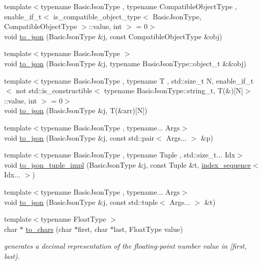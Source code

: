 \begin{DoxyCompactItemize}
{\footnotesize template$<$typename Basic\+Json\+Type , typename Compatible\+Object\+Type , enable\+\_\+if\+\_\+t$<$ is\+\_\+compatible\+\_\+object\+\_\+type$<$ Basic\+Json\+Type, Compatible\+Object\+Type $>$\+::value, int $>$  = 0$>$ }\\void \hyperlink{namespacenlohmann_1_1detail_a24c9c12f3839c94e09532f08de85e949}{to\+\_\+json} (Basic\+Json\+Type \&j, const Compatible\+Object\+Type \&obj)
\item 
{\footnotesize template$<$typename Basic\+Json\+Type $>$ }\\void \hyperlink{namespacenlohmann_1_1detail_ac9f7a5542851c61d93740148eaec509f}{to\+\_\+json} (Basic\+Json\+Type \&j, typename Basic\+Json\+Type\+::object\+\_\+t \&\&obj)
\item 
{\footnotesize template$<$typename Basic\+Json\+Type , typename T , std\+::size\+\_\+t N, enable\+\_\+if\+\_\+t$<$ not std\+::is\+\_\+constructible$<$ typename Basic\+Json\+Type\+::string\+\_\+t, T(\&)\mbox{[}\+N\mbox{]}$>$\+::value, int $>$  = 0$>$ }\\void \hyperlink{namespacenlohmann_1_1detail_a8c4d301fc51996e3c5c1257fb92ace20}{to\+\_\+json} (Basic\+Json\+Type \&j, T(\&arr)\mbox{[}N\mbox{]})
\item 
{\footnotesize template$<$typename Basic\+Json\+Type , typename... Args$>$ }\\void \hyperlink{namespacenlohmann_1_1detail_aa30611f74062379d3420c40487cf3bb3}{to\+\_\+json} (Basic\+Json\+Type \&j, const std\+::pair$<$ Args... $>$ \&p)
\item 
{\footnotesize template$<$typename Basic\+Json\+Type , typename Tuple , std\+::size\+\_\+t... Idx$>$ }\\void \hyperlink{namespacenlohmann_1_1detail_a510dfa15b01e9a8afe31600a27b28199}{to\+\_\+json\+\_\+tuple\+\_\+impl} (Basic\+Json\+Type \&j, const Tuple \&t, \hyperlink{structnlohmann_1_1detail_1_1index__sequence}{index\+\_\+sequence}$<$ Idx... $>$)
\item 
{\footnotesize template$<$typename Basic\+Json\+Type , typename... Args$>$ }\\void \hyperlink{namespacenlohmann_1_1detail_aa7a47b08eee864c2c108c04954919648}{to\+\_\+json} (Basic\+Json\+Type \&j, const std\+::tuple$<$ Args... $>$ \&t)
\item 
{\footnotesize template$<$typename Float\+Type $>$ }\\char $\ast$ \hyperlink{namespacenlohmann_1_1detail_a6192f1eab05fbbc5c35edb8368c8fc57}{to\+\_\+chars} (char $\ast$first, char $\ast$last, Float\+Type value)
\begin{DoxyCompactList}\small\item\em generates a decimal representation of the floating-\/point number value in \mbox{[}first, last). \end{DoxyCompactList}\end{DoxyCompactItemize}


